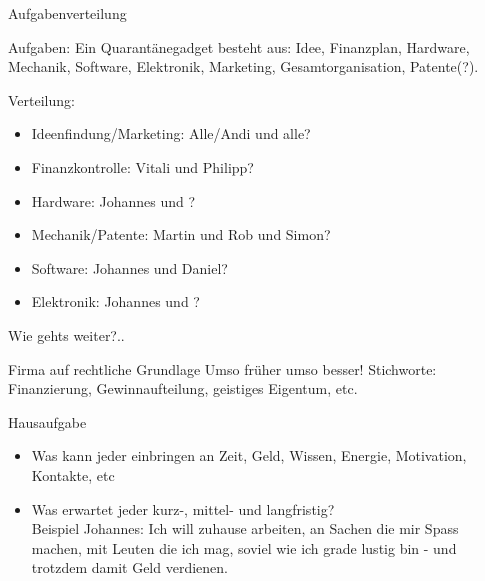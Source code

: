 \documentclass{beamer}
\begin{document}
\begin{frame}{Aufgabenverteilung}

\begin{exampleblock}{Aufgaben:}
Ein Quarant\"anegadget besteht aus: Idee, Finanzplan, Hardware, Mechanik, Software, Elektronik, Marketing, Gesamtorganisation, Patente(?). 
\end{exampleblock}

\begin{alertblock}{Verteilung:}
\begin{itemize}
 \item Ideenfindung/Marketing: Alle/Andi und alle?
 \item Finanzkontrolle: Vitali und Philipp?
 \item Hardware: Johannes und ?
 \item Mechanik/Patente: Martin und Rob und Simon?
 \item Software: Johannes und Daniel?
 \item Elektronik: Johannes und ?
\end{itemize}

\end{alertblock}


\end{frame}


\begin{frame}{Wie gehts weiter?..}

\begin{alertblock}{Firma auf rechtliche Grundlage}
Umso fr\"uher umso besser! Stichworte: Finanzierung, Gewinnaufteilung, geistiges Eigentum, etc.
\end{alertblock}

\begin{alertblock}{Hausaufgabe}
\begin{itemize}
 \item Was kann jeder einbringen an Zeit, Geld, Wissen, Energie, Motivation, Kontakte, etc
 \item Was erwartet jeder kurz-, mittel- und langfristig?\\
 Beispiel Johannes: Ich will zuhause arbeiten, an Sachen die mir Spass machen, mit Leuten die ich mag, soviel wie ich grade lustig bin - und trotzdem damit Geld verdienen.
\end{itemize}
\end{alertblock}

\end{frame}
\end{document}
